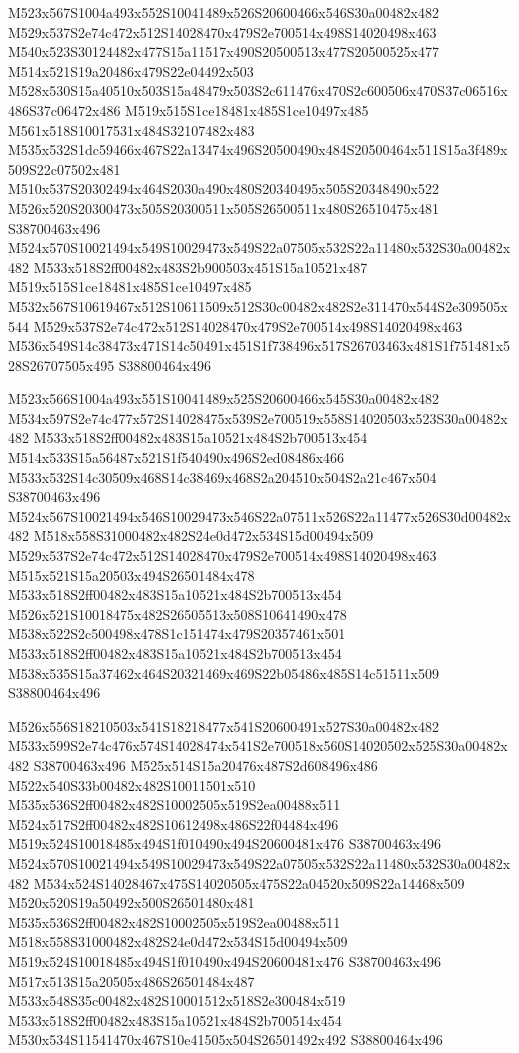 \documentclass{article}
\begin{document}
\begin{multicols}{2}
M523x567S1004a493x552S10041489x526S20600466x546S30a00482x482 M529x537S2e74c472x512S14028470x479S2e700514x498S14020498x463 M540x523S30124482x477S15a11517x490S20500513x477S20500525x477 M514x521S19a20486x479S22e04492x503 M528x530S15a40510x503S15a48479x503S2c611476x470S2c600506x470S37c06516x486S37c06472x486 M519x515S1ce18481x485S1ce10497x485 M561x518S10017531x484S32107482x483 M535x532S1dc59466x467S22a13474x496S20500490x484S20500464x511S15a3f489x509S22c07502x481 M510x537S20302494x464S2030a490x480S20340495x505S20348490x522 M526x520S20300473x505S20300511x505S26500511x480S26510475x481 S38700463x496 M524x570S10021494x549S10029473x549S22a07505x532S22a11480x532S30a00482x482 M533x518S2ff00482x483S2b900503x451S15a10521x487 M519x515S1ce18481x485S1ce10497x485 M532x567S10619467x512S10611509x512S30c00482x482S2e311470x544S2e309505x544 M529x537S2e74c472x512S14028470x479S2e700514x498S14020498x463 M536x549S14c38473x471S14c50491x451S1f738496x517S26703463x481S1f751481x528S26707505x495 S38800464x496

M523x566S1004a493x551S10041489x525S20600466x545S30a00482x482 M534x597S2e74c477x572S14028475x539S2e700519x558S14020503x523S30a00482x482 M533x518S2ff00482x483S15a10521x484S2b700513x454 M514x533S15a56487x521S1f540490x496S2ed08486x466 M533x532S14c30509x468S14c38469x468S2a204510x504S2a21c467x504 S38700463x496 M524x567S10021494x546S10029473x546S22a07511x526S22a11477x526S30d00482x482 M518x558S31000482x482S24e0d472x534S15d00494x509 M529x537S2e74c472x512S14028470x479S2e700514x498S14020498x463 M515x521S15a20503x494S26501484x478 M533x518S2ff00482x483S15a10521x484S2b700513x454 M526x521S10018475x482S26505513x508S10641490x478 M538x522S2c500498x478S1c151474x479S20357461x501 M533x518S2ff00482x483S15a10521x484S2b700513x454 M538x535S15a37462x464S20321469x469S22b05486x485S14c51511x509 S38800464x496

M526x556S18210503x541S18218477x541S20600491x527S30a00482x482 M533x599S2e74c476x574S14028474x541S2e700518x560S14020502x525S30a00482x482 S38700463x496 M525x514S15a20476x487S2d608496x486 M522x540S33b00482x482S10011501x510 M535x536S2ff00482x482S10002505x519S2ea00488x511 M524x517S2ff00482x482S10612498x486S22f04484x496 M519x524S10018485x494S1f010490x494S20600481x476 S38700463x496 M524x570S10021494x549S10029473x549S22a07505x532S22a11480x532S30a00482x482 M534x524S14028467x475S14020505x475S22a04520x509S22a14468x509 M520x520S19a50492x500S26501480x481 M535x536S2ff00482x482S10002505x519S2ea00488x511 M518x558S31000482x482S24e0d472x534S15d00494x509 M519x524S10018485x494S1f010490x494S20600481x476 S38700463x496 M517x513S15a20505x486S26501484x487 M533x548S35c00482x482S10001512x518S2e300484x519 M533x518S2ff00482x483S15a10521x484S2b700514x454 M530x534S11541470x467S10e41505x504S26501492x492 S38800464x496


\end{multicols}
\end{document}
